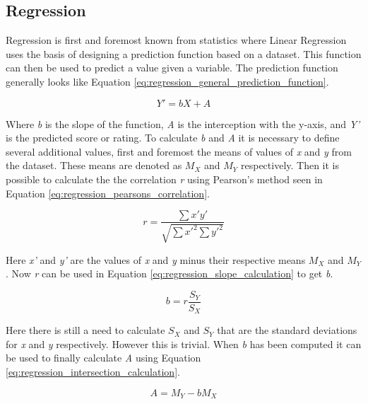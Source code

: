 \subsection{Regression} \label{bg:sub:regression}
Regression is first and foremost known from statistics where Linear Regression uses the basis of designing a prediction function based on a dataset. This function can then be used to predict a value given a variable.
The prediction function generally looks like Equation \ref{eq:regression_general_prediction_function}.

\begin{equation} \label{eq:regression_general_prediction_function}
	Y' = bX + A
\end{equation}

Where \textit{b} is the slope of the function, \textit{A} is the interception with the y-axis, and \textit{Y'} is the predicted score or rating.
To calculate \textit{b} and \textit{A} it is necessary to define several additional values, first and foremost the means of values of \textit{x} and \textit{y} from the dataset. These means are denoted as \textit{$M_{X}$} and \textit{$M_{Y}$} respectively. Then it is possible to calculate the the correlation \textit{r} using Pearson's method seen in Equation \ref{eq:regression_pearsons_correlation}.

\begin{equation} \label{eq:regression_pearsons_correlation}
	r = \frac{\sum x'y'}{\sqrt{\sum x'^{2}\sum y'^{2}}}
\end{equation}

Here \textit{x'} and \textit{y'} are the values of  \textit{x} and \textit{y} minus their respective means \textit{$M_{X}$} and \textit{$M_{Y}$}. Now \textit{r} can be used in Equation \ref{eq:regression_slope_calculation} to get \textit{b}.

\begin{equation} \label{eq:regression_slope_calculation}
	b = r\frac{S_{Y}}{S_{X}}
\end{equation}

Here there is still a need to calculate \textit{$S_{X}$} and \textit{$S_{Y}$} that are the standard deviations for \textit{x} and \textit{y} respectively. However this is trivial. When \textit{b} has been computed it can be used to finally calculate \textit{A} using Equation \ref{eq:regression_intersection_calculation}.

\begin{equation} \label{eq:regression_intersection_calculation}
	A = M_{Y} - bM_{X}
\end{equation}